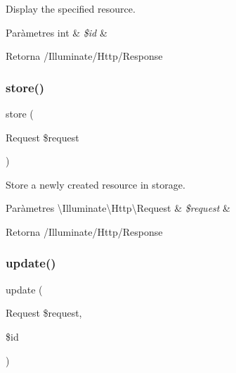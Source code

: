 Display the specified resource.


\begin{DoxyParams}[1]{Paràmetres}
int & {\em \$id} & \\
\hline
\end{DoxyParams}
\begin{DoxyReturn}{Retorna}
/\+Illuminate/\+Http/\+Response 
\end{DoxyReturn}
\mbox{\label{class_app_1_1_http_1_1_controllers_1_1_zones_controller_a9ef485163104597c12185b53cdacf638}} 
\subsubsection{\texorpdfstring{store()}{store()}}
{\footnotesize\ttfamily store (\begin{DoxyParamCaption}\item[{Request}]{\$request }\end{DoxyParamCaption})}

Store a newly created resource in storage.


\begin{DoxyParams}[1]{Paràmetres}
\textbackslash{}\+Illuminate\textbackslash{}\+Http\textbackslash{}\+Request & {\em \$request} & \\
\hline
\end{DoxyParams}
\begin{DoxyReturn}{Retorna}
/\+Illuminate/\+Http/\+Response 
\end{DoxyReturn}
\mbox{\label{class_app_1_1_http_1_1_controllers_1_1_zones_controller_affb03cc19897a1800a0f411264d6c7cc}} 
\subsubsection{\texorpdfstring{update()}{update()}}
{\footnotesize\ttfamily update (\begin{DoxyParamCaption}\item[{Request}]{\$request,  }\item[{}]{\$id }\end{DoxyParamCaption})}

